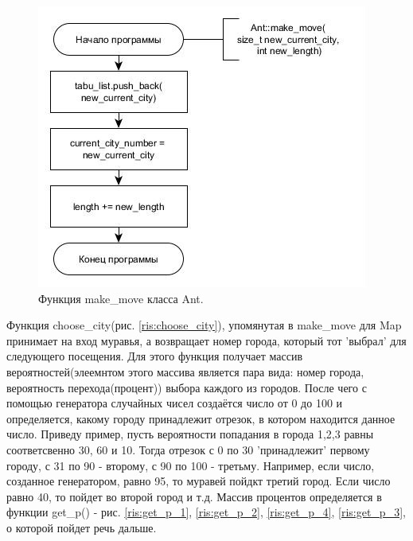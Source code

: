 \documentclass[a4paper, 14pt]{article}
\begin{document}
\begin{figure}[h!]
\center
\includegraphics[scale=0.7]{ant_make_move.jpg}
\caption{Функция make\_move класса Ant.}
\label{ris:ant_make_move}
\end{figure}\newpage

Функция choose\_city(рис. \ref{ris:choose_city}), упомянутая в make\_move для Map принимает на вход муравья, а возвращает номер города, который тот 'выбрал' для следующего посещения. Для этого функция получает массив вероятностей(элеемнтом этого массива является пара вида: номер города, вероятность перехода(процент)) выбора каждого из городов. После чего с помощью генератора случайных чисел создаётся число от 0 до 100 и определяется, какому городу принадлежит отрезок, в котором находится данное число. Приведу пример, пусть вероятности попадания в города 1,2,3 равны соответсвенно 30, 60 и 10. Тогда отрезок с 0 по 30 'принадлежит' первому городу, с 31 по 90 - второму, с 90 по 100 - третьму. Например, если число, созданное генератором, равно 95, то муравей пойдкт третий город. Если число равно 40, то пойдет во второй город и т.д. Массив процентов определяется в функции get\_p() - рис. \ref{ris:get_p_1}, \ref{ris:get_p_2}, \ref{ris:get_p_4}, \ref{ris:get_p_3}, о которой пойдет речь дальше.
\end{document}
